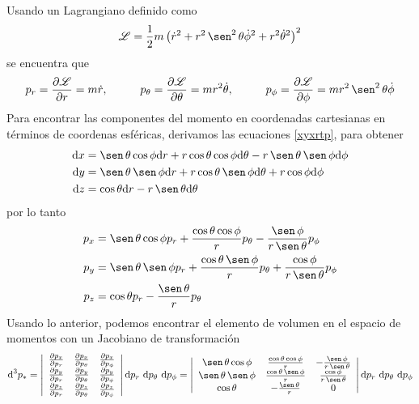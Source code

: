 \documentclass[11pt,twoside,openright,spanish]{report}
\numberwithin{equation}{chapter}
\numberwithin{figure}{chapter}
\numberwithin{table}{chapter}
\renewcommand{\sin}{\operatorname{\sen}}
\begin{document}
Usando un Lagrangiano definido como
\begin{equation}
\mathcal{L}=\frac{1}{2}m\left(\dot{r}^2+r^2\sin^2\theta\dot{\phi}^2+r^2\dot{\theta}^2\right)^2
\end{equation}
se encuentra que
\begin{equation}
p_r=\frac{\partial\mathcal{L}}{\partial r}=m\dot{r},\hspace{1cm}p_\theta=\frac{\partial\mathcal{L}}{\partial \theta}=mr^2\dot{\theta},\hspace{1cm}p_\phi=\frac{\partial\mathcal{L}}{\partial \phi}=mr^2\sin^2\theta\dot{\phi}
\end{equation}
Para encontrar las componentes del momento en coordenadas cartesianas en términos de coordenas esféricas, derivamos las ecuaciones \eqref{xyxrtp}, para obtener
\begin{subequations}
	\begin{align}
	\text{d}x&=\sin\theta\cos\phi\text{d}r+r\cos\theta\cos\phi\text{d}\theta-r\sin\theta\sin\phi\text{d}\phi\\
	\text{d}y&=\sin\theta\sin\phi\text{d}r+r\cos\theta\sin\phi\text{d}\theta+r\cos\phi\text{d}\phi\\
	\text{d}z&=\cos\theta\text{d}r-r\sin\theta\text{d}\theta
	\end{align}
\end{subequations}
por lo tanto
\begin{subequations}
	\begin{align}
	p_x&=\sin\theta\cos\phi p_r+\frac{\cos\theta\cos\phi}{r}p_\theta-\frac{\sin\phi}{r\sin\theta}p_\phi\\
	p_y&=\sin\theta\sin\phi p_r+\frac{\cos\theta\sin\phi}{r} p_\theta+\frac{\cos\phi}{r\sin\theta} p_\phi\\
	p_z&=\cos\theta p_r-\frac{\sin\theta}{r}p_\theta
	\end{align}
\end{subequations}
Usando lo anterior, podemos encontrar el elemento de volumen en el espacio de momentos con un Jacobiano de transformación
\begin{equation*}
\text{d}^3p_* = \left| \begin{array}{ccc}
\frac{\partial p_x}{\partial p_r} & \frac{\partial p_x}{\partial p_\theta}  & \frac{\partial p_x}{\partial p_\phi}  \\
\frac{\partial p_y}{\partial p_r} & \frac{\partial p_y}{\partial p_\theta}  & \frac{\partial p_y}{\partial p_\phi}  \\
\frac{\partial p_z}{\partial p_r} & \frac{\partial p_z}{\partial p_\theta}  & \frac{\partial p_z}{\partial p_\phi}   \end{array} \right|\text{d}p_r\ \text{d}p_\theta\ \text{d}p_\phi= \left| \begin{array}{ccc}
\sin\theta\cos\phi&\frac{\cos\theta\cos\phi}{r} & -\frac{\sin\phi}{r\sin\theta}\\
\sin\theta\sin\phi&\frac{\cos\theta\sin\phi}{r}& \frac{\cos\phi}{r\sin\theta}\\
\cos\theta & -\frac{\sin\theta}{r}& 0 \end{array} \right|\text{d}p_r\ \text{d}p_\theta\ \text{d}p_\phi
\end{equation*}
\end{document}
